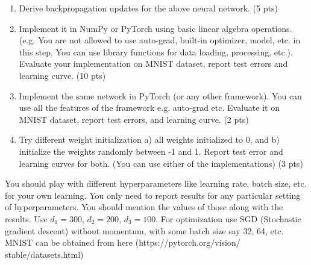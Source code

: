 \documentclass[a4paper]{article}
\theoremstyle{definition}
\begin{document}
\begin{enumerate}
    \item Derive backpropagation updates for the above neural network. (5 pts)
    \item Implement it in NumPy or PyTorch using basic linear algebra operations. (e.g. You are not allowed to use auto-grad, built-in optimizer, model, etc. in this step. You can use library functions for data loading, processing, etc.). Evaluate your implementation on MNIST dataset, report test errors and learning curve. (10 pts)
    \item Implement the same network in PyTorch (or any other framework). You can use all the features of the framework e.g. auto-grad etc. Evaluate it on MNIST dataset, report test errors, and learning curve. (2 pts)
    \item Try different weight initialization a) all weights initialized to 0, and b) initialize the weights randomly between -1 and 1. Report test error and learning curves for both. (You can use either of the implementations) (3 pts)
\end{enumerate}

You should play with different hyperparameters like learning rate, batch size, etc. for your own learning. You only need to report results for any particular setting of hyperparameters. You should mention the values of those along with the results. Use $d_1 = 300$, $d_2 = 200$, $d_3 = 100$. For optimization use SGD (Stochastic gradient descent) without momentum, with some batch size say 32, 64, etc. MNIST can be obtained from here (https://pytorch.org/vision/ stable/datasets.html)


\end{document}
